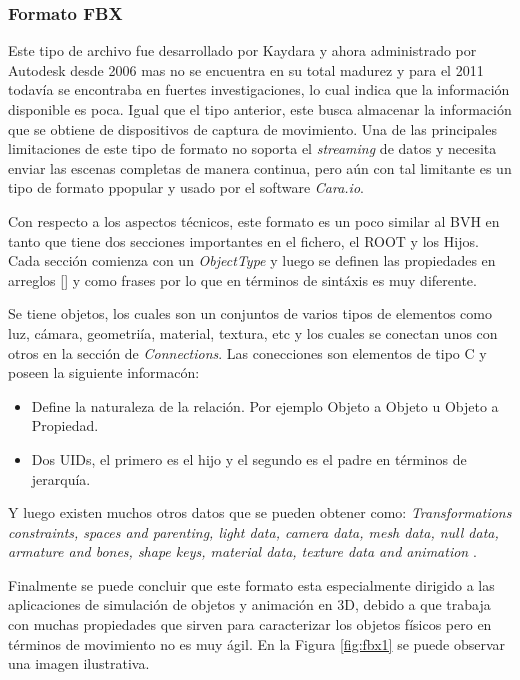 \documentclass[11pt,letterpaper]{article}     %
\begin{document}
\subsubsection{Formato FBX}
Este tipo de archivo fue desarrollado por Kaydara y ahora administrado por Autodesk desde 2006 mas no se encuentra en su total madurez y para el 2011 todav\' ia se encontraba en fuertes investigaciones, lo cual indica que la informaci\' on disponible es poca. 
Igual que el tipo anterior, este busca almacenar la informaci\' on que se obtiene de dispositivos de captura de movimiento.
Una de las principales limitaciones de este tipo de formato no soporta el \textit{streaming} de datos y necesita enviar las escenas completas de manera continua, pero a\' un con tal limitante es un tipo de formato ppopular y usado por el software \textit{Cara.io}.

Con respecto a los aspectos t\' ecnicos, este formato es un poco similar al BVH en tanto que tiene dos secciones importantes en el fichero, el ROOT y los Hijos. Cada secci\' on comienza con un \textit{ObjectType} y luego se definen las propiedades en arreglos [] y como frases por lo que en t\' erminos de sint\' axis es muy diferente.

Se tiene objetos, los cuales son un conjuntos de varios tipos de elementos como luz, c\' amara, geometri\' ia, material, textura, etc y los cuales  se conectan unos con otros en la secci\' on de \textit{Connections}. 
Las conecciones son elementos de tipo C y poseen la siguiente informac\' on: 
\begin{itemize}
\item Define la naturaleza de la relaci\' on. Por ejemplo Objeto a Objeto u Objeto a Propiedad.
\item Dos UIDs, el primero es el hijo y el segundo es el padre en t\' erminos de jerarqu\' ia.
\end{itemize}

Y luego existen muchos otros datos que se pueden obtener como: \textit{Transformations constraints, spaces and parenting, light data, camera data, mesh data, null data, armature and bones, shape keys, material data, texture data and animation } \cite{fbxmanual}.

Finalmente se puede concluir que este formato esta especialmente dirigido a las aplicaciones de simulaci\' on de objetos y animaci\' on en 3D, debido a que trabaja con muchas propiedades que sirven para caracterizar los objetos f\' isicos pero en t\' erminos de movimiento no es muy \' agil. En la Figura \ref{fig:fbx1} se puede observar una imagen ilustrativa.
\end{document}
